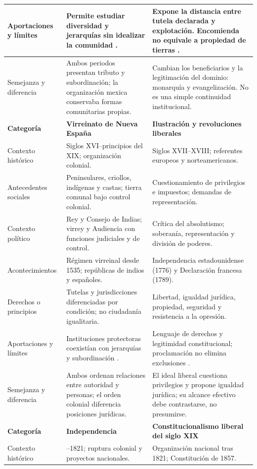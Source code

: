 \documentclass[12pt,spanish,letterpaper,oneside]{article}
\newcommand{\encabezado}[2]{\rowcolor{cabecera}\textbf{Categor\'ia}&\textbf{#1}&\textbf{#2}\\\hline}
\newlength{\categorywidth}
\newlength{\periodwidth}
\newlength{\lastperiodwidth}
\begin{document}
\begin{landscape}
\begin{longtable}{|>{\raggedright\arraybackslash}p{\categorywidth}|>{\raggedright\arraybackslash}p{\periodwidth}|>{\raggedright\arraybackslash}p{\lastperiodwidth}|}
Aportaciones y l\'imites & Permite estudiar diversidad y jerarqu\'ias sin idealizar la comunidad \citep[cap.~1]{brom2017}. & Expone la distancia entre tutela declarada y explotaci\'on. Encomienda no equivale a propiedad de tierras \citep[caps.~4--5]{brom2017}. \\\hline
Semejanza y diferencia & Ambos periodos presentan tributo y subordinaci\'on; la organizaci\'on mexica conservaba formas comunitarias propias. & Cambian los beneficiarios y la legitimaci\'on del dominio: monarqu\'ia y evangelizaci\'on. No es una simple continuidad institucional. \\\hline
\encabezado{Virreinato de Nueva Espa\~na}{Ilustraci\'on y revoluciones liberales}
Contexto hist\'orico & Siglos XVI--principios del XIX; organizaci\'on colonial. & Siglos XVII--XVIII; referentes europeos y norteamericanos. \\\hline
Antecedentes sociales & Peninsulares, criollos, ind\'igenas y castas; tierra comunal bajo control colonial. & Cuestionamiento de privilegios e impuestos; demandas de representaci\'on. \\\hline
Contexto pol\'itico & Rey y Consejo de Indias; virrey y Audiencia con funciones judiciales y de control. & Cr\'itica del absolutismo; soberan\'ia, representaci\'on y divisi\'on de poderes. \\\hline
Acontecimientos & R\'egimen virreinal desde 1535; rep\'ublicas de indios y espa\~noles. & Independencia estadounidense (1776) y Declaraci\'on francesa (1789). \\\hline
Derechos o principios & Tutelas y jurisdicciones diferenciadas por condici\'on; no ciudadan\'ia igualitaria. & Libertad, igualdad jur\'idica, propiedad, seguridad y resistencia a la opresi\'on. \\\hline
Aportaciones y l\'imites & Instituciones protectoras coexist\'ian con jerarqu\'ias y subordinaci\'on \citep[caps.~5--6]{brom2017}. & Lenguaje de derechos y legitimidad constitucional; proclamaci\'on no elimina exclusiones \citep[pp.~11--13]{alvarez2009}. \\\hline
Semejanza y diferencia & Ambos ordenan relaciones entre autoridad y personas; el orden colonial diferencia posiciones jur\'idicas. & El ideal liberal cuestiona privilegios y propone igualdad jur\'idica; su alcance efectivo debe contrastarse, no presumirse. \\\hline
\pagebreak
\encabezado{Independencia}{Constitucionalismo liberal del siglo XIX}
Contexto hist\'orico & 1810--1821; ruptura colonial y proyectos nacionales. & Organizaci\'on nacional tras 1821; Constituci\'on de 1857. \\\hline

\end{longtable}
\end{landscape}
\end{document}
